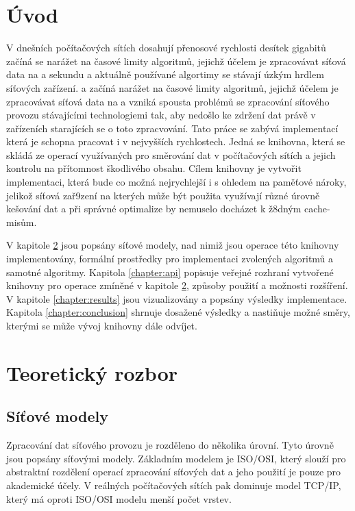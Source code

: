 
\chapter{Úvod}
V dnešních počítačových sítích dosahují přenosové rychlosti desítek gigabitů začíná se narážet na
časové limity algoritmů, jejichž účelem je zpracovávat síťová data na a sekundu
a aktuálně používané algortimy se stávají úzkým hrdlem síťových zařízení.
a začíná narážet na časové limity algoritmů, jejichž účelem je zpracovávat síťová data na
a vzniká spousta problémů se zpracování síťového provozu stávajícími technologiemi tak,
 aby nedošlo ke zdržení dat právě v zařízeních starajících se o toto zpracvování.
Tato práce se zabývá implementací která je schopna pracovat i v nejvyšších rychlostech.
Jedná se knihovna, která se skládá ze operací využívaných pro směrování dat v počítačových sítích
a jejich kontrolu na přítomnost škodlivého obsahu. Cílem knihovny je vytvořit implementaci, která bude
co možná nejrychlejší i s ohledem na paměťové nároky, jelikož síťová zař9zení na kterých může být použita
využívají různé úrovně kešování dat a při správné optimalize by nemuselo docházet k ž8dným cache-misům.

V kapitole \ref{chapter:theoretical} jsou popsány síťové modely, nad nimiž jsou operace této knihovny implementovány,
formální prostředky pro implementaci zvolených algoritmů a samotné algoritmy. Kapitola \ref{chapter:api} popisuje
veřejné rozhraní vytvořené knihovny pro operace zmíněné v kapitole \ref{chapter:theoretical},
způsoby použití a možnosti rozšíření. V kapitole \ref{chapter:results} jsou vizualizovány a popsány
výsledky implementace. Kapitola \ref{chapter:conclusion} shrnuje dosažené výsledky a nastiňuje možné směry,
kterými se může vývoj knihovny dále odvíjet.


\chapter{Teoretický rozbor}\label{chapter:theoretical}

\section{Síťové modely}

Zpracování dat síťového provozu je rozděleno do několika úrovní. Tyto úrovně jsou popsány síťovými modely.
Základním modelem je ISO/OSI, který slouží pro abstraktní rozdělení operací zpracování síťových dat a jeho použití je
pouze pro akademické účely. V reálných počítačových sítích pak dominuje model TCP/IP, který má oproti
ISO/OSI modelu menší počet vrstev.

